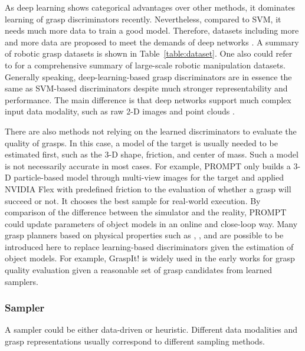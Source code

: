 \documentclass[letterpaper,10pt]{article}
\newcommand{\tabref}[1]{Table~\ref{#1}}
\begin{document}
As deep learning shows categorical advantages over other methods, it dominates learning of grasp discriminators recently.
Nevertheless, compared to SVM, it needs much more data to train a good model.
Therefore, datasets including more and more data are proposed to meet the demands of deep networks \cite{bullock2015yale, calli2017yale, mahler2016dex, mahler2018dex, depierre2018jacquard, wang2019multimodal, fang2020graspnet, eppner2021acronym, cao2021suctionnet, zhang2018visual, zhang2022regrad}.
A summary of robotic grasp datasets is shown in \tabref{table:dataset}.
One also could refer to \cite{huang2016recent} for a comprehensive summary of large-scale robotic manipulation datasets.
Generally speaking, deep-learning-based grasp discriminators are in essence the same as SVM-based discriminators despite much stronger representability and performance.
The main difference is that deep networks support much complex input data modality, such as raw 2-D images \cite{lenz2015deep} and point clouds \cite{gualtieri2016high, ten2017grasp, liang2019pointnetgpd, li2020learning}.

There are also methods not relying on the learned discriminators to evaluate the quality of grasps.
In this case, a model of the target is usually needed to be estimated first, such as the 3-D shape, friction, and center of mass.
Such a model is not necessarily accurate in most cases.
For example, PROMPT \cite{chen2021ab} only builds a 3-D particle-based model through multi-view images for the target and applied NVIDIA Flex with predefined friction to the evaluation of whether a grasp will succeed or not.
It chooses the best sample for real-world execution.
By comparison of the difference between the simulator and the reality, PROMPT could update parameters of object models in an online and close-loop way.
Many grasp planners based on physical properties such as \cite{kragic2001real}, \cite{miller2004graspit}, and \cite{berenson2009manipulation} are possible to be introduced here to replace learning-based discriminators given the estimation of object models.
For example, GraspIt! \cite{miller2004graspit} is widely used in the early works for grasp quality evaluation given a reasonable set of grasp candidates from learned samplers.

\subsubsection{Sampler}

A sampler could be either data-driven or heuristic.
Different data modalities and grasp representations usually correspond to different sampling methods.
\end{document}
